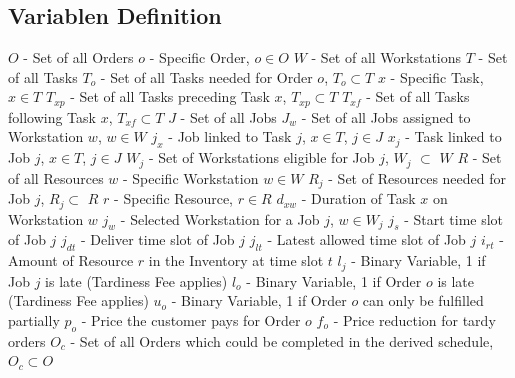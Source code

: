 \documentclass[a4paper,12pt,twoside]{scrreprt}
\begin{document}
\subsection*{Variablen Definition}
\begin{flushleft}
$O$ - Set of all Orders\linebreak
$o$ - Specific Order, $o \in O$\linebreak
$W$	- Set of all Workstations\linebreak
$T$	- Set of all Tasks\linebreak
$T_{o}$ - Set of all Tasks needed for Order $o$, $T_{o} \subset T$\linebreak
$x$ - Specific Task, $x \in T$\linebreak
$T_{xp}$ - Set of all Tasks preceding Task $x$, $T_{xp} \subset T$\linebreak
$T_{xf}$ - Set of all Tasks following Task $x$, $T_{xf} \subset T$\linebreak
$J$ - Set of all Jobs\linebreak
$J_{w}$ - Set of all Jobs assigned to Workstation $w$, $w \in W$\linebreak
$j_{x}$ - Job linked to Task $j$, $x \in T$, $j \in J$\linebreak
$x_{j}$ - Task linked to Job $j$, $x \in T$, $j \in J$\linebreak
$W_{j}$ -	Set of Workstations eligible for Job $j$, $W_{j}$ $\subset$ $W$ \linebreak
$R$ - Set of all Resources \linebreak
$w$ - Specific Workstation $w \in W$ \linebreak
$R_{j}$ - Set of Resources needed for Job $j$, $R_{j} \subset$ $R$ \linebreak
$r$ - Specific Resource, $r \in R$ \linebreak
$d_{xw}$ - Duration of Task $x$ on Workstation $w$ \linebreak
$j_{w}$ - Selected Workstation for a Job $j$, $w\in W_{j}$ \linebreak
$j_{s}$ - Start time slot of Job $j$\linebreak
$j_{dt}$ - Deliver time slot of Job $j$\linebreak
$j_{lt}$ - Latest allowed time slot of Job $j$\linebreak
$i_{rt}$ - Amount of Resource $r$ in the Inventory at time slot $t$\linebreak
$l_{j}$ - Binary Variable, 1 if Job $j$ is late (Tardiness Fee applies)\linebreak
$l_{o}$ - Binary Variable, 1 if Order $o$ is late (Tardiness Fee applies)\linebreak
$u_{o}$ - Binary Variable, 1 if Order $o$ can only be fulfilled partially\linebreak
$p_{o}$ - Price the customer pays for Order $o$ \linebreak
$f_{o}$ - Price reduction for tardy orders \linebreak
$O_{c}$ - Set of all Orders which could be completed in the derived schedule, $O_{c} \subset O$\linebreak
\end{flushleft}
\end{document}
